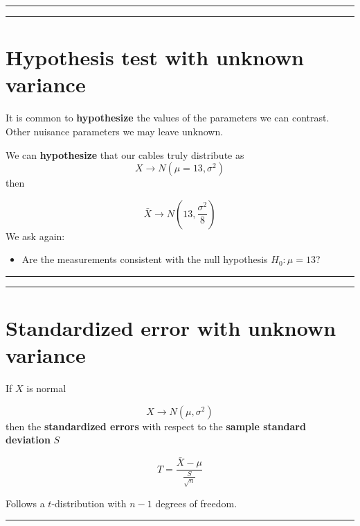 \documentclass[
]{book}
\providecommand{\tightlist}{%
  \setlength{\itemsep}{0pt}\setlength{\parskip}{0pt}}
\begin{document}
\begin{center}\rule{0.5\linewidth}{0.5pt}\end{center}

\begin{center}\rule{0.5\linewidth}{0.5pt}\end{center}

\hypertarget{hypothesis-test-with-unknown-variance}{%
\section{Hypothesis test with unknown variance}\label{hypothesis-test-with-unknown-variance}}

It is common to \textbf{hypothesize} the values of the parameters we can contrast. Other nuisance parameters we may leave unknown.

We can \textbf{hypothesize} that our cables truly distribute as \[X \rightarrow N(\mu=13, \sigma^2)\] then

\[\bar{X} \rightarrow N(13, \frac{\sigma^2}{8})\]
We ask again:

\begin{itemize}
\tightlist
\item
  Are the measurements consistent with the null hypothesis \(H_0: \mu=13\)?
\end{itemize}

\begin{center}\rule{0.5\linewidth}{0.5pt}\end{center}

\begin{center}\rule{0.5\linewidth}{0.5pt}\end{center}

\hypertarget{standardized-error-with-unknown-variance}{%
\section{Standardized error with unknown variance}\label{standardized-error-with-unknown-variance}}

If \(X\) is normal

\[X \rightarrow N(\mu, \sigma^2)\] then the \textbf{standardized errors} with respect to the \textbf{sample standard deviation} \(S\)

\[T=\frac{\bar{X}-\mu}{\frac{S}{\sqrt{n}}}\]

Follows a \(t\)-distribution with \(n-1\) degrees of freedom.

\begin{center}\rule{0.5\linewidth}{0.5pt}\end{center}
\end{document}
